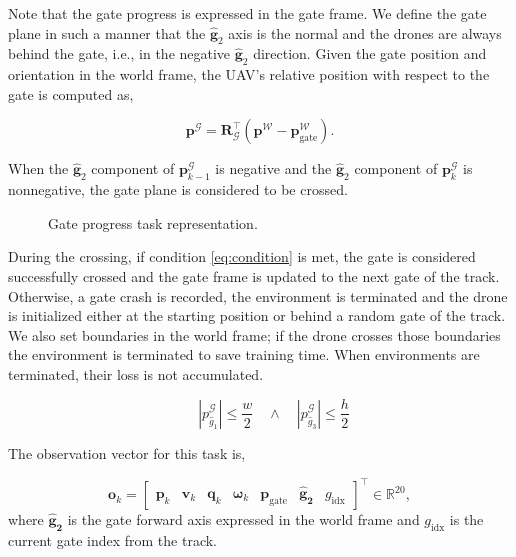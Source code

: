 Note that the gate progress is expressed in the gate frame.
We define the gate plane in such a manner that the $\hat{\mathbf{g}}_2$ axis is the normal and the drones are always behind the gate, i.e., in the negative $\hat{\mathbf{g}}_2$ direction.
Given the gate position and orientation in the world frame, the \ac{UAV}'s relative position with respect to the gate is computed as,

\begin{equation}
    \mathbf{p}^{\mathcal{G}} = \mathbf{R}_{\mathcal{G}}^\top \left( \mathbf{p}^\mathcal{W} - \mathbf{p}^\mathcal{W}_{\text{gate}} \right).
\end{equation}

When the $\hat{\mathbf{g}}_2$ component of $\mathbf{p}_{k-1}^\mathcal{G}$ is negative and the $\hat{\mathbf{g}}_2$ component of $\mathbf{p}_{k}^\mathcal{G}$ is nonnegative, the gate plane is considered to be crossed.

\begin{figure}[H]
    \centering
    
    \caption{Gate progress task representation.}
    \label{fig:gate_geometryy}
\end{figure}

During the crossing, if condition \eqref{eq:condition} is met, the gate is considered successfully crossed and the gate frame is updated to the next gate of the track.
Otherwise, a gate crash is recorded, the environment is terminated and the drone is initialized either at the starting position or behind a random gate of the track.
We also set boundaries in the world frame; if the drone crosses those boundaries the environment is terminated to save training time.
When environments are terminated, their loss is not accumulated.

\begin{equation}
    \label{eq:condition}
    \quad \quad
    \left| p^\mathcal{G}_{\hat{g}_1} \right| \leq \frac{w}{2}
    \quad \wedge \quad
    \left| p^\mathcal{G}_{\hat{g}_3} \right| \leq \frac{h}{2}
\end{equation}

The observation vector for this task is,

\begin{equation}\label{obs-GP}
\mathbf{o}_k =
\begin{bmatrix}
\mathbf{p}_{k} & 
\mathbf{v}_{k} & 
\mathbf{q}_k &
\boldsymbol{\omega}_k &
\mathbf{p}_{\text{gate}} &
\mathbf{\hat{g}_2} &
g_\text{idx}
\end{bmatrix}^\top
\in \mathbb{R}^{20},
\end{equation}
where $\mathbf{\hat{g}_2}$ is the gate forward axis expressed in the world frame and $g_\text{idx}$ is the current gate index from the track.

